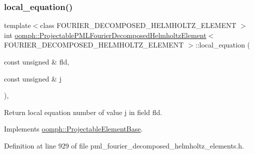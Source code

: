 \subsubsection{\texorpdfstring{local\+\_\+equation()}{local\_equation()}}
{\footnotesize\ttfamily template$<$class F\+O\+U\+R\+I\+E\+R\+\_\+\+D\+E\+C\+O\+M\+P\+O\+S\+E\+D\+\_\+\+H\+E\+L\+M\+H\+O\+L\+T\+Z\+\_\+\+E\+L\+E\+M\+E\+NT $>$ \\
int \hyperlink{classoomph_1_1ProjectablePMLFourierDecomposedHelmholtzElement}{oomph\+::\+Projectable\+P\+M\+L\+Fourier\+Decomposed\+Helmholtz\+Element}$<$ F\+O\+U\+R\+I\+E\+R\+\_\+\+D\+E\+C\+O\+M\+P\+O\+S\+E\+D\+\_\+\+H\+E\+L\+M\+H\+O\+L\+T\+Z\+\_\+\+E\+L\+E\+M\+E\+NT $>$\+::local\+\_\+equation (\begin{DoxyParamCaption}\item[{const unsigned \&}]{fld,  }\item[{const unsigned \&}]{j }\end{DoxyParamCaption})\hspace{0.3cm}{\ttfamily [inline]}, {\ttfamily [virtual]}}



Return local equation number of value j in field fld. 



Implements \hyperlink{classoomph_1_1ProjectableElementBase_ac5c27ae929ff636dc7747fe23fd4f738}{oomph\+::\+Projectable\+Element\+Base}.



Definition at line 929 of file pml\+\_\+fourier\+\_\+decomposed\+\_\+helmholtz\+\_\+elements.\+h.

\mbox{\label{classoomph_1_1ProjectablePMLFourierDecomposedHelmholtzElement_a58a9c476841f68800763a24421717f63}} 
